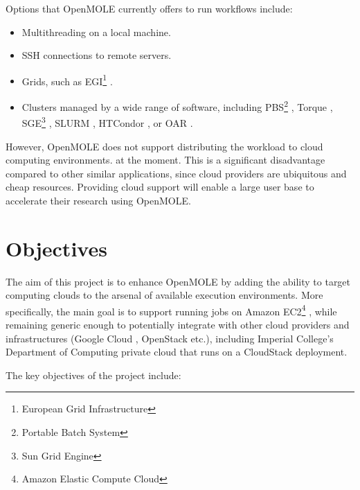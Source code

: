 Options that OpenMOLE currently offers to run workflows include:

\begin{itemize}
	\item Multithreading on a local machine.
	\item SSH connections to remote servers.
	\item Grids, such as EGI\footnote{European Grid Infrastructure} \cite{EGI}.
	\item Clusters managed by a wide range of software, including PBS\footnote{Portable Batch System} \cite{PBS}, Torque \cite{Torque}, SGE\footnote{Sun Grid Engine} \cite{SGE}, SLURM \cite{SLURM}, HTCondor \cite{HTCondor}, or OAR \cite{OAR}.
\end{itemize}

However, OpenMOLE does not support distributing the workload to cloud computing environments. at the moment. This is a significant disadvantage compared to other similar applications, since cloud providers are ubiquitous and cheap resources. Providing cloud support will enable a large user base to accelerate their research using OpenMOLE.

\section{Objectives}

The aim of this project is to enhance OpenMOLE by adding the ability to target computing clouds to the arsenal of available execution environments. More specifically, the main goal is to support running jobs on Amazon EC2\footnote{Amazon Elastic Compute Cloud} \cite{EC2}, while remaining generic enough to potentially integrate with other cloud providers and infrastructures (Google Cloud \cite{GoogleCloud}, OpenStack \cite{OpenStack} etc.), including Imperial College's Department of Computing private cloud that runs on a CloudStack \cite{CloudStack} deployment.

The key objectives of the project include:


